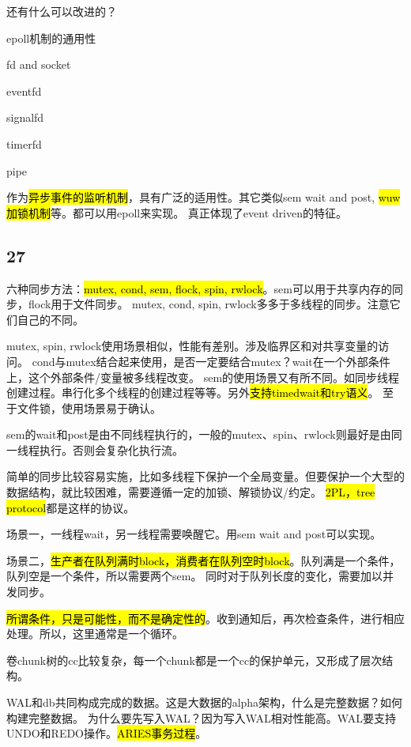 还有什么可以改进的？

epoll机制的通用性
\begin{enumbox}
\item fd and socket
\item eventfd
\item signalfd
\item timerfd
\item pipe
\end{enumbox}

作为\hl{异步事件的监听机制}，具有广泛的适用性。其它类似sem wait and post, \hl{wuw加锁机制}等。都可以用epoll来实现。
真正体现了event driven的特征。

\subsection{27}

六种同步方法：\hl{mutex, cond, sem, flock, spin, rwlock}。sem可以用于共享内存的同步，flock用于文件同步。
mutex, cond, spin, rwlock多多于多线程的同步。注意它们自己的不同。

mutex, spin, rwlock使用场景相似，性能有差别。涉及临界区和对共享变量的访问。
cond与mutex结合起来使用，是否一定要结合mutex？wait在一个外部条件上，这个外部条件/变量被多线程改变。
sem的使用场景又有所不同。如同步线程创建过程。串行化多个线程的创建过程等等。另外\hl{支持timedwait和try语义}。
至于文件锁，使用场景易于确认。

sem的wait和post是由不同线程执行的，一般的mutex、spin、rwlock则最好是由同一线程执行。否则会复杂化执行流。

简单的同步比较容易实施，比如多线程下保护一个全局变量。但要保护一个大型的数据结构，就比较困难，需要遵循一定的加锁、解锁协议/约定。
\hl{2PL，tree protocol}都是这样的协议。

场景一，一线程wait，另一线程需要唤醒它。用sem wait and post可以实现。

场景二，\hl{生产者在队列满时block，消费者在队列空时block}。队列满是一个条件，队列空是一个条件，所以需要两个sem。
同时对于队列长度的变化，需要加以并发同步。

\hl{所谓条件，只是可能性，而不是确定性的}。收到通知后，再次检查条件，进行相应处理。所以，这里通常是一个循环。

卷chunk树的cc比较复杂，每一个chunk都是一个cc的保护单元，又形成了层次结构。

\hrulefill

WAL和db共同构成完成的数据。这是大数据的alpha架构，什么是完整数据？如何构建完整数据。
为什么要先写入WAL？因为写入WAL相对性能高。WAL要支持UNDO和REDO操作。\hl{ARIES事务过程}。

